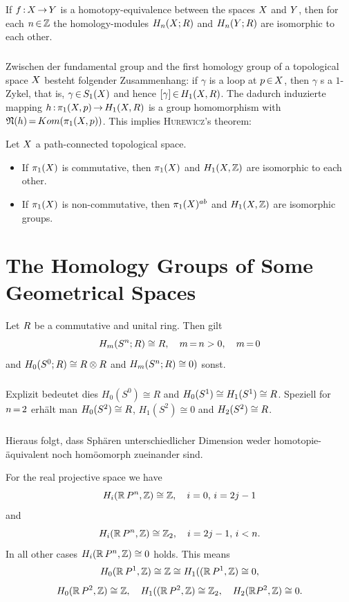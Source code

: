 \documentclass[11pt,twoside]{article}
\begin{document}
\begin{theorem1}
If $f{\,:\,}X {\,\to\,} Y$ is a homotopy-equivalence
between the spaces $X$ and $Y$,
then for each $n {\,\in\,} {\mathbb{Z}}$ the homology-modules
$H_n(X;R)$ and $H_n(Y;R)$ are isomorphic to each other.
\end{theorem1}

\subparagraph{}
Zwischen der fundamental group and the first homology group
of a topological space $X$ besteht folgender Zusammenhang:
if $\gamma$ is a loop at $p {\,\in\,} X$,
then $\gamma$ s a $1$-Zykel,
that is,
$\gamma {\,\in\,} S_1(X)$ and hence $[\gamma] {\,\in\,} H_1(X,R)$.
The dadurch induzierte mapping $h{\,:\,}\pi_1(X,p) {\,\to\,} H_1(X,R)$
is a group homomorphism with $\mathfrak{N}(h) {\,=\,} Kom(\pi_1(X,p))$.
This implies \textsc{Hurewicz}'s theorem:

\begin{theorem1}
Let $X$ a path-connected topological space.
\begin{itemize}
\item
If $\pi_1(X)$ is commutative,
then $\pi_1(X)$ and $H_1(X,{\mathbb{Z}})$ are isomorphic to each other.
\item
If $\pi_1(X)$ is non-commutative,
then $\pi_1(X)^{ab}$ and $H_1(X,{\mathbb{Z}})$ are isomorphic groups.
\end{itemize}
\end{theorem1}

\section{The Homology Groups of Some Geometrical Spaces}
Let $R$ be a commutative and unital ring.
Then gilt
\[
H_m(S^n;R) \cong R, \quad m {\,=\,} n > 0, \quad m {\,=\,} 0
\]
and $H_0(S^0;R) \cong R \otimes R$ and $H_m(S^n;R) \cong 0)$ sonst.

\subparagraph{}
Explizit bedeutet dies $H_0(S^0) \cong R$ and $H_0(S^1) \cong H_1(S^1) \cong R$.
Speziell for $n {\,=\,} 2$ erh\"alt man $H_0(S^2) \cong R$,
$H_1(S^2) \cong 0$ and $H_2(S^2) \cong R$.

\subparagraph{}
Hieraus folgt,
dass Sph\"aren unterschiedlicher Dimension weder homotopie-\"aquivalent
noch hom\"oomorph zueinander sind.

For the real projective space we have
\[
H_i({\mathbb{R}}\,P^n,{\mathbb{Z}}) \cong {\mathbb{Z}}, \quad i=0, \, i=2j-1
\]
and
\[
H_i({\mathbb{R}}\,P^n,{\mathbb{Z}}) \cong {\mathbb{Z}}_2, \quad i=2j-1, \, i < n.
\]
In all other cases $H_i({\mathbb{R}}\,P^n,{\mathbb{Z}}) \cong 0$ holds.
This means
\[
H_0({\mathbb{R}}\,P^1,{\mathbb{Z}}) \cong {\mathbb{Z}} \cong H_1(({\mathbb{R}}\,P^1,{\mathbb{Z}}) \cong 0,
\]
\[
H_0({\mathbb{R}}\,P^2,{\mathbb{Z}}) \cong {\mathbb{Z}}, \quad  H_1(({\mathbb{R}}\,P^2,{\mathbb{Z}}) \cong {\mathbb{Z}}_2,
\quad H_2({\mathbb{R}} P^2,{\mathbb{Z}}) \cong 0.
\]
\end{document}
